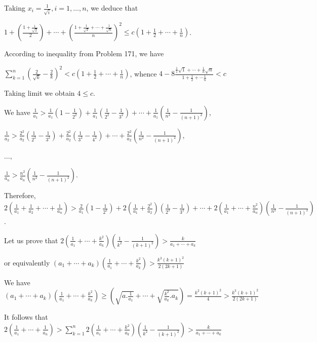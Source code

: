   Taking $x_i = \frac{1}{\sqrt{i}}, i = 1, \ldots, n$, we deduce that

  $1 + \left(\frac{1 + \frac{1}{\sqrt{2}}}{2}\right) + \cdots + \left(\frac{1 + \frac{1}{\sqrt{2}} + \cdots
    + \frac{1}{\sqrt{n}}}{n}\right)^2\leq c\left(1 + \frac{1}{2} + \cdots + \frac{1}{n}\right)$.

  According to inequality from Problem 171, we have

  $\displaystyle\sum_{k = 1}^n\left(\frac{2}{\sqrt{k}} - \frac{2}{k}\right)^2 < c\left(1 + \frac{1}{2}
  + \cdots + \frac{1}{n}\right)$, whence $4 - 8\frac{\frac{1}{1}\sqrt{1} + \cdots + \frac{1}{n}\sqrt{n}}{1 +
    \frac{1}{2} + \cdots \frac{1}{n}} < c$

  Taking limit we obtain $4\leq c$.
\item We have $\frac{1}{a_1} > \frac{1}{a_1}\left(1 - \frac{1}{2^2}\right)
  + \frac{1}{a_1}\left(\frac{1}{2^2} - \frac{1}{3^2}\right) + \cdots + \frac{1}{a_1}\left(\frac{1}{n^2}
  - \frac{1}{(n + 1)^2}\right)$,

  $\frac{1}{a_2} > \frac{2^2}{a_2}\left(\frac{1}{2^2} - \frac{1}{3^2}\right)
  + \frac{2^2}{a_2}\left(\frac{1}{3^2} - \frac{1}{4^2}\right) + \cdots + \frac{2^2}{a_2}\left(\frac{1}{n^2}
  - \frac{1}{(n + 1)^2}\right)$,

  $\ldots$,

  $\frac{1}{a_n} > \frac{n^2}{a_n}\left(\frac{1}{n^2} - \frac{1}{(n + 1)^2}\right)$.

  Therefore, $2\left(\frac{1}{a_1} + \frac{1}{a_2} + \cdots + \frac{1}{a_n}\right) > \frac{2}{a_1}\left(1
  - \frac{1}{2^2}\right) + 2\left(\frac{1}{a_1} + \frac{2^2}{a_2}\right)\left(\frac{1}{2^2}
  - \frac{1}{3^2}\right) + \cdots + 2\left(\frac{1}{a_1} + \cdots
  + \frac{n^2}{a_n}\right)\left(\frac{1}{n^2} - \frac{1}{(n + 1)^2}\right)$.

  Let us prove that $2\left(\frac{1}{a_1} + \cdots + \frac{k^2}{a_k}\right)\left(\frac{1}{k^2} - \frac{1}{(k
    + 1)^2}\right) > \frac{k}{a_1 + \cdots + a_k}$

  or equivalently $(a_1 + \cdots + a_k)\left(\frac{1}{a_1} + \cdots + \frac{k^2}{a_k}\right) > \frac{k^3(k +
    1)^2}{2(2k + 1)}$

  We have $(a_1 + \cdots + a_k)\left(\frac{1}{a_1} + \cdots
  + \frac{k^2}{a_k}\right)\geq \left(\sqrt{a.\frac{1}{a_1}} + \cdots + \sqrt{\frac{k^2}{a_k}.a_k}\right)
  = \frac{k^2(k + 1)^2}{4} > \frac{k^3(k + 1)^2}{2(2k + 1)}$

  It follows that $2\left(\frac{1}{a_1} + \cdots + \frac{1}{a_n}\right)> \displaystyle\sum_{k =
    1}^n2\left(\frac{1}{a_1} + \cdots + \frac{k^2}{a_k}\right)\left(\frac{1}{k^2} - \frac{1}{(k +
    1)^2}\right) > \frac{k}{a_1 + \cdots + a_k}$

